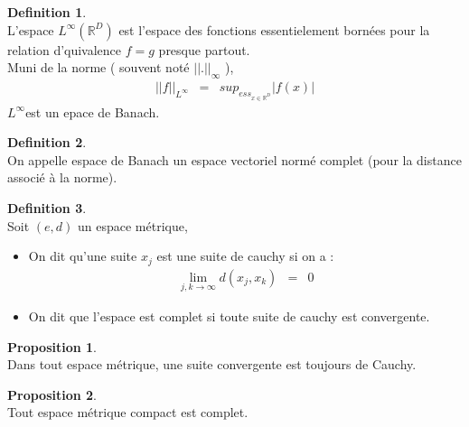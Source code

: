 \documentclass[a4paper,11pt]{article} %
\theoremstyle{plain}
\theoremstyle{definition}
\newtheorem{dfn}{Definition}[section]
\newtheorem{prop}{Proposition}[section]
\theoremstyle{remark}
\numberwithin{equation}{section}
\numberwithin{equation}{subsection}
\numberwithin{figure}{section}
\begin{document}
\begin{dfn} $\left. \right. $\\
 L'espace $L^{\infty}(\mathbb{R}^{D})$ est l'espace des fonctions essentielement bornées pour la relation d'quivalence $f=g$ presque partout.\\
Muni de la norme ( souvent noté $\left|\left| .  \right| \right|_{\infty}$ ),
\begin{eqnarray*}
 \left|\left| f  \right| \right|_{L^{\infty}}  &=& sup_{ess_{x \in \mathbb{R}^{D} }}  \left| f(x) \right|
\end{eqnarray*}
$L^{\infty}$est un epace de Banach.
\end{dfn}
\begin{dfn} $\left. \right. $\\
 On appelle espace de Banach un espace vectoriel normé complet (pour la distance associé à la norme).
\end{dfn}
\begin{dfn} $\left. \right. $\\
 Soit $(e,d)$ un espace métrique,
\begin{itemize}
 \item On dit qu'une suite $x_{j}$ est une suite de cauchy si on a :
\begin{eqnarray*}
 \lim_{j,k  \to \infty}  d(x_{j}, x_{k}) &=& 0
\end{eqnarray*}
\item On dit que l'espace est complet si toute suite de cauchy est convergente.
\end{itemize}
\end{dfn}
\begin{prop} $\left. \right. $\\
 Dans tout espace métrique, une suite convergente est toujours de Cauchy.
\end{prop}
\begin{prop} $\left. \right. $\\
 Tout espace métrique compact est complet.
\end{prop}
\end{document}
